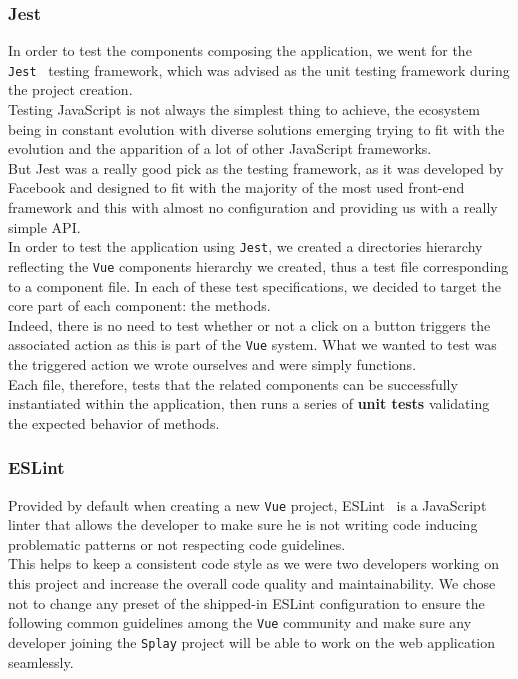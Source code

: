\documentclass{eplmastersthesis}
\begin{document}
        \subsubsection{Jest}

          In order to test the components composing the application, we
          went for the \texttt{Jest}~\cite{jest} testing framework, which was advised
          as the unit testing framework during the project creation.\\

          Testing JavaScript is not always the simplest thing to achieve, the
          ecosystem being in constant evolution with diverse solutions emerging
          trying to fit with the evolution and the apparition of a lot of
          other JavaScript frameworks.\\
          But Jest was a really good pick as the testing framework, as it was
          developed by Facebook and designed to fit with the majority of the
          most used front-end framework and this with almost no configuration and
          providing us with a really simple API.\\

          In order to test the application using \texttt{Jest}, we created a directories
          hierarchy reflecting the \texttt{Vue} components hierarchy we created, thus
          a test file corresponding to a component file. In each of these
          test specifications, we decided to target the core part of each
          component: the methods.\\
          Indeed, there is no need to test whether or not a click on a button
          triggers the associated action as this is part of the \texttt{Vue} system. What
          we wanted to test was the triggered action we wrote ourselves and
          were simply functions.\\
          Each file, therefore, tests that the related components can be
          successfully instantiated within the application, then runs a series
          of \textbf{unit tests} validating the expected behavior of methods.

        \subsubsection{ESLint}

          Provided by default when creating a new \texttt{Vue} project, ESLint~\cite{eslint}
          is a JavaScript linter that allows the developer to
          make sure he is not writing code inducing problematic patterns or not
          respecting code guidelines.\\
          This helps to keep a consistent code style as we were two developers working
          on this project and increase the overall code quality and
          maintainability. We chose not to change any preset of the shipped-in
          ESLint configuration to ensure the following common guidelines among the \texttt{Vue}
          community and make sure any developer joining the \texttt{Splay} project will
          be able to work on the web application seamlessly.
\end{document}
